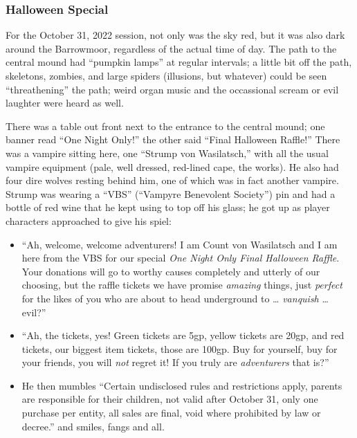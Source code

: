 \subsubsection{Halloween Special}

For the October 31, 2022 session, not only was the sky red, but it was also
dark around the Barrowmoor, regardless of the actual time of day. The path to
the central mound had ``pumpkin lamps'' at regular intervals; a little bit off
the path, skeletons, zombies, and large spiders (illusions, but whatever) could
be seen ``threathening'' the path; weird organ music and the occassional scream
or evil laughter were heard as well.

There was a table out front next to the entrance to the central mound; one banner
read ``One Night Only!'' the other said ``Final Halloween Raffle!'' There was a
vampire sitting here, one ``Strump von Wasilatsch,'' with all the usual vampire
equipment (pale, well dressed, red-lined cape, the works). He also had four dire
wolves resting behind him, one of which was in fact another vampire. Strump was
wearing a ``VBS'' (``Vampyre Benevolent Society'') pin and had a bottle of red
wine that he kept using to top off his glass; he got up as player characters
approached to give his spiel:

\begin{itemize}

\item ``Ah, welcome, welcome adventurers! I am Count von Wasilatsch and I am
  here from the VBS for our special \emph{One Night Only Final Halloween Raffle}.
  Your donations will go to worthy causes completely and utterly of our choosing,
  but the raffle tickets we have promise \emph{amazing} things, just \emph{perfect}
  for the likes of you who are about to head underground to \dots{} \emph{vanquish}
  \dots{} evil?''

\item ``Ah, the tickets, yes! Green tickets are 5gp, yellow tickets are 20gp,
  and red tickets, our biggest item tickets, those are 100gp. Buy for yourself,
  buy for your friends, you will \emph{not} regret it! If you truly are
  \emph{adventurers} that is?''

\item He then mumbles ``Certain undisclosed rules and restrictions apply,
  parents are responsible for their children, not valid after October 31, only
  one purchase per entity, all sales are final, void where prohibited by law or
  decree.'' and smiles, fangs and all.

\end{itemize}

